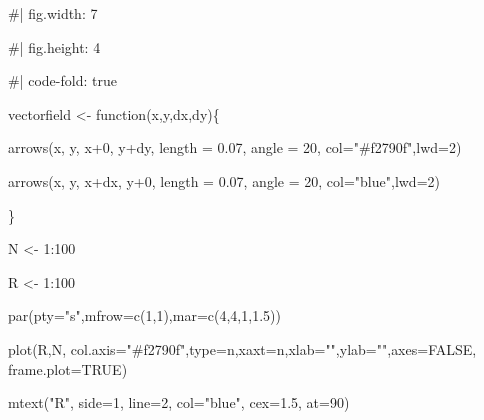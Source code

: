 \documentclass[
  a4paper,
]{scrbook}
\newenvironment{Shaded}{\begin{snugshade}}{\end{snugshade}}
\newcommand{\AttributeTok}[1]{\textcolor[rgb]{0.40,0.45,0.13}{#1}}
\newcommand{\CommentTok}[1]{\textcolor[rgb]{0.37,0.37,0.37}{#1}}
\newcommand{\ConstantTok}[1]{\textcolor[rgb]{0.56,0.35,0.01}{#1}}
\newcommand{\ControlFlowTok}[1]{\textcolor[rgb]{0.00,0.23,0.31}{#1}}
\newcommand{\DecValTok}[1]{\textcolor[rgb]{0.68,0.00,0.00}{#1}}
\newcommand{\FloatTok}[1]{\textcolor[rgb]{0.68,0.00,0.00}{#1}}
\newcommand{\FunctionTok}[1]{\textcolor[rgb]{0.28,0.35,0.67}{#1}}
\newcommand{\NormalTok}[1]{\textcolor[rgb]{0.00,0.23,0.31}{#1}}
\newcommand{\OtherTok}[1]{\textcolor[rgb]{0.00,0.23,0.31}{#1}}
\newcommand{\SpecialCharTok}[1]{\textcolor[rgb]{0.37,0.37,0.37}{#1}}
\newcommand{\StringTok}[1]{\textcolor[rgb]{0.13,0.47,0.30}{#1}}
\theoremstyle{definition}
\theoremstyle{remark}
\begin{document}
\begin{Shaded}
\begin{Highlighting}[]
\CommentTok{\#| fig.width: 7}

\CommentTok{\#| fig.height: 4}

\CommentTok{\#| code{-}fold: true}

\NormalTok{vectorfield }\OtherTok{\textless{}{-}} \ControlFlowTok{function}\NormalTok{(x,y,dx,dy)\{}

  \FunctionTok{arrows}\NormalTok{(x, y, x}\SpecialCharTok{+}\DecValTok{0}\NormalTok{, y}\SpecialCharTok{+}\NormalTok{dy, }\AttributeTok{length =} \FloatTok{0.07}\NormalTok{, }\AttributeTok{angle =} \DecValTok{20}\NormalTok{, }\AttributeTok{col=}\StringTok{"\#f2790f"}\NormalTok{,}\AttributeTok{lwd=}\DecValTok{2}\NormalTok{)}

  \FunctionTok{arrows}\NormalTok{(x, y, x}\SpecialCharTok{+}\NormalTok{dx, y}\SpecialCharTok{+}\DecValTok{0}\NormalTok{, }\AttributeTok{length =} \FloatTok{0.07}\NormalTok{, }\AttributeTok{angle =} \DecValTok{20}\NormalTok{, }\AttributeTok{col=}\StringTok{"blue"}\NormalTok{,}\AttributeTok{lwd=}\DecValTok{2}\NormalTok{)}

\NormalTok{\}}

\NormalTok{N }\OtherTok{\textless{}{-}} \DecValTok{1}\SpecialCharTok{:}\DecValTok{100}

\NormalTok{R }\OtherTok{\textless{}{-}} \DecValTok{1}\SpecialCharTok{:}\DecValTok{100}

\FunctionTok{par}\NormalTok{(}\AttributeTok{pty=}\StringTok{"s"}\NormalTok{,}\AttributeTok{mfrow=}\FunctionTok{c}\NormalTok{(}\DecValTok{1}\NormalTok{,}\DecValTok{1}\NormalTok{),}\AttributeTok{mar=}\FunctionTok{c}\NormalTok{(}\DecValTok{4}\NormalTok{,}\DecValTok{4}\NormalTok{,}\DecValTok{1}\NormalTok{,}\FloatTok{1.5}\NormalTok{))}

\FunctionTok{plot}\NormalTok{(R,N,  }\AttributeTok{col.axis=}\StringTok{"\#f2790f"}\NormalTok{,}\AttributeTok{type=}\StringTok{\textquotesingle{}n\textquotesingle{}}\NormalTok{,}\AttributeTok{xaxt=}\StringTok{\textquotesingle{}n\textquotesingle{}}\NormalTok{,}\AttributeTok{xlab=}\StringTok{""}\NormalTok{,}\AttributeTok{ylab=}\StringTok{""}\NormalTok{,}\AttributeTok{axes=}\ConstantTok{FALSE}\NormalTok{, }\AttributeTok{frame.plot=}\ConstantTok{TRUE}\NormalTok{)}

\FunctionTok{mtext}\NormalTok{(}\StringTok{"R"}\NormalTok{, }\AttributeTok{side=}\DecValTok{1}\NormalTok{, }\AttributeTok{line=}\DecValTok{2}\NormalTok{, }\AttributeTok{col=}\StringTok{"blue"}\NormalTok{, }\AttributeTok{cex=}\FloatTok{1.5}\NormalTok{, }\AttributeTok{at=}\DecValTok{90}\NormalTok{)}


\end{Highlighting}
\end{Shaded}
\end{document}
